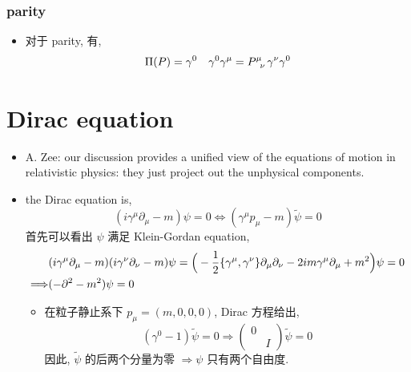 \subsubsection{parity}
\begin{itemize}
	\item 对于 parity, 有,
	\begin{equation}
		\Pi(P) = \gamma^0 \quad \gamma^0 \gamma^\mu = \tensor{P}{^\mu_\nu} \gamma^\nu \gamma^0
	\end{equation}
\end{itemize}

\section{Dirac equation}
\begin{itemize}
	\item A. Zee: our discussion provides a unified view of the equations of motion in relativistic physics: they just project out the unphysical components.
	
	\item the Dirac equation is,
	\begin{equation}
		(i \gamma^\mu \partial_\mu - m) \psi = 0 \iff (\gamma^\mu p_\mu - m) \tilde{\psi} = 0
	\end{equation}
	首先可以看出 $\psi$ 满足 Klein-Gordan equation,
	\begin{align}
		& (i \gamma^\mu \partial_\mu - m) (i \gamma^\nu \partial_\nu - m) \psi = \Big( - \frac{1}{2} \{\gamma^\mu, \gamma^\nu\} \partial_\mu \partial_\nu - 2 i m \gamma^\mu \partial_\mu + m^2 \Big) \psi = 0 \notag \\
		\Longrightarrow & (- \partial^2 - m^2) \psi = 0
	\end{align}
	\begin{itemize}
		\item 在粒子静止系下 $p_\mu = (m, 0, 0, 0)$, Dirac 方程给出,
		\begin{equation}
			(\gamma^0 - 1) \tilde{\psi} = 0 \Longrightarrow \begin{pmatrix}
				0 & \\
				& I
			\end{pmatrix} \tilde{\psi} = 0
		\end{equation}
		因此, $\tilde{\psi}$ 的后两个分量为零 $\Longrightarrow \psi$ 只有两个自由度.
	\end{itemize}
\end{itemize}
